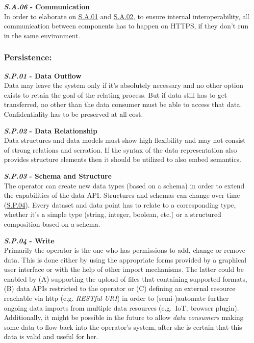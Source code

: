 \documentclass[12pt,english,a4paper,titlepage,cleardoublepage=empty,dottedtoc]{report}
\begin{document}
\textbf{\emph{\protect\hypertarget{sa06}{}{S.A.06}} - Communication}\\
In order to elaborate on \protect\hyperlink{sa01}{S.A.01} and
\protect\hyperlink{sa02}{S.A.02}, to ensure internal interoperability,
all communication between components has to happen on HTTPS, if they
don't run in the same environment.

\subsubsection{Persistence:}\label{persistence}

\textbf{\emph{\protect\hypertarget{sp01}{}{S.P.01}} - Data Outflow}\\
Data may leave the system only if it's absolutely necessary and no other
option exists to retain the goal of the relating process. But if data
still has to get transferred, no other than the data consumer must be
able to access that data. Confidentiality has to be preserved at all
cost.

\textbf{\emph{\protect\hypertarget{sp02}{}{S.P.02}} - Data
Relationship}\\
Data structures and data models must show high flexibility and may not
consist of strong relations and serration. If the syntax of the data
representation also provides structure elements then it should be
utilized to also embed semantics.

\textbf{\emph{\protect\hypertarget{sp03}{}{S.P.03}} - Schema and
Structure}\\
The operator can create new data types (based on a schema) in order to
extend the capabilities of the data API. Structures and schemas can
change over time (\protect\hyperlink{sp04}{S.P.04}). Every dataset and
data point has to relate to a corresponding type, whether it's a simple
type (string, integer, boolean, etc.) or a structured composition based
on a schema.

\textbf{\emph{\protect\hypertarget{sp04}{}{S.P.04}} - Write}\\
Primarily the operator is the one who has permissions to add, change or
remove data. This is done either by using the appropriate forms provided
by a graphical user interface or with the help of other import
mechanisms. The latter could be enabled by (A) supporting the upload of
files that containing supported formats, (B) data APIs restricted to the
operator or (C) defining an external resource reachable via http (e.g.
\emph{RESTful URI}) in order to (semi-)automate further ongoing data
imports from multiple data resources (e.g.~IoT, browser plugin).
Additionally, it might be possible in the future to allow \emph{data
consumers} making some data to flow back into the operator's system,
after she is certain that this data is valid and useful for her.
\end{document}
